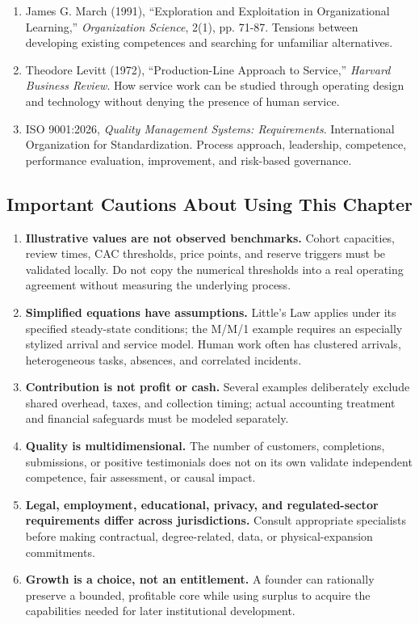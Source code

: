 \begin{enumerate}
    \item[\textbf{[R10]}] James G. March (1991), ``Exploration and Exploitation in Organizational Learning,'' \textit{Organization Science}, 2(1), pp. 71-87. Tensions between developing existing competences and searching for unfamiliar alternatives.
    \item[\textbf{[R11]}] Theodore Levitt (1972), ``Production-Line Approach to Service,'' \textit{Harvard Business Review}. How service work can be studied through operating design and technology without denying the presence of human service.
    \item[\textbf{[R12]}] ISO 9001:2026, \textit{Quality Management Systems: Requirements}. International Organization for Standardization. Process approach, leadership, competence, performance evaluation, improvement, and risk-based governance.
\end{enumerate}

\subsection*{Important Cautions About Using This Chapter}
\label{sec:important_cautions}

\begin{enumerate}
    \item \textbf{Illustrative values are not observed benchmarks.} Cohort capacities, review times, CAC thresholds, price points, and reserve triggers must be validated locally. Do not copy the numerical thresholds into a real operating agreement without measuring the underlying process.
    \item \textbf{Simplified equations have assumptions.} Little's Law applies under its specified steady-state conditions; the M/M/1 example requires an especially stylized arrival and service model. Human work often has clustered arrivals, heterogeneous tasks, absences, and correlated incidents.
    \item \textbf{Contribution is not profit or cash.} Several examples deliberately exclude shared overhead, taxes, and collection timing; actual accounting treatment and financial safeguards must be modeled separately.
    \item \textbf{Quality is multidimensional.} The number of customers, completions, submissions, or positive testimonials does not on its own validate independent competence, fair assessment, or causal impact.
    \item \textbf{Legal, employment, educational, privacy, and regulated-sector requirements differ across jurisdictions.} Consult appropriate specialists before making contractual, degree-related, data, or physical-expansion commitments.
    \item \textbf{Growth is a choice, not an entitlement.} A founder can rationally preserve a bounded, profitable core while using surplus to acquire the capabilities needed for later institutional development.
\end{enumerate}

